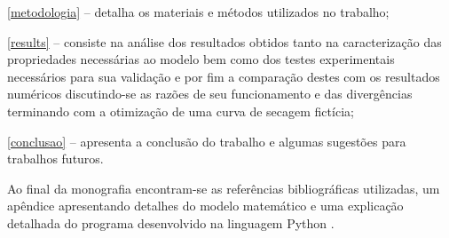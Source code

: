 \autoref{metodologia} – detalha os materiais e métodos utilizados no trabalho;
    
\autoref{results} – consiste na análise dos resultados obtidos tanto na
caracterização das propriedades necessárias ao modelo bem como dos testes
experimentais necessários para sua validação e por fim a comparação destes com
os resultados numéricos discutindo-se as razões de seu funcionamento e das
divergências terminando com a otimização de uma curva de secagem fictícia;

\autoref{conclusao} – apresenta a conclusão do trabalho e algumas sugestões para
trabalhos futuros.
    
Ao final da monografia encontram-se as referências bibliográficas utilizadas, um
apêndice apresentando detalhes do modelo matemático e uma explicação detalhada
do programa desenvolvido na linguagem Python \cite{python}.
